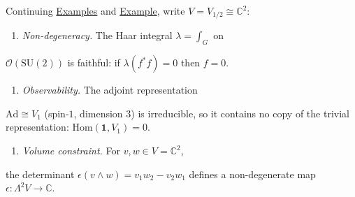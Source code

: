 \begin{example}
  \label{ex:qou-su2}
Continuing \hyperref[ex:rigid-monoidal-vect]{Examples}
and \hyperref[ex:quantum-universe-su2]{Example}, write
$V = V_{1/2} \cong \mathbb{C}^2$:

\begin{enumerate}
  \item \emph{Non-degeneracy.} The Haar integral $\lambda = \int_G$ on
\end{enumerate}
   $\mathcal{O}(\mathrm{SU}(2))$ is faithful: if
   $\lambda(f^* f) = 0$ then $f = 0$.

\begin{enumerate}
  \item \emph{Observability.} The adjoint representation
\end{enumerate}
   $\mathrm{Ad} \cong V_1$ (spin-$1$, dimension $3$)
   is irreducible, so it contains no copy of the
   trivial representation: $\mathrm{Hom}(\mathbf{1}, V_1) = 0$.

\begin{enumerate}
  \item \emph{Volume constraint.} For $v, w \in V = \mathbb{C}^2$,
\end{enumerate}
   the determinant
   $\epsilon(v \wedge w) = v_1 w_2 - v_2 w_1$
   defines a non-degenerate map
   $\epsilon \colon \Lambda^2 V \to \mathbb{C}$.
\end{example}

